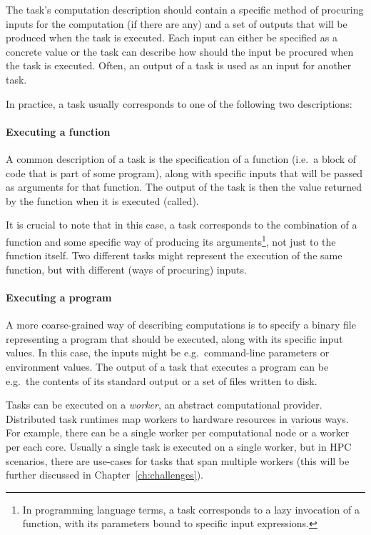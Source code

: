 The task's computation description should contain a specific method of procuring inputs for the
computation (if there are any) and a set of outputs that will be produced when the task is
executed. Each input can either be specified as a concrete value or the task can describe how
should the input be procured when the task is executed. Often, an output of a task is used as an
input for another task.

In practice, a task usually corresponds to one of the following two descriptions:

\paragraph{Executing a function} A common description of a task is the specification of a
function (i.e.\ a block of code that is part of some program), along with specific inputs that will
be passed as arguments for that function. The output of the task is then the value returned by the
function when it is executed (called).

It is crucial to note that in this case, a task corresponds to the combination of a function and
some specific way of producing its arguments\footnote{In programming language terms, a task corresponds to a lazy invocation of a function, with its parameters bound to specific input expressions.}, not just to the function
itself. Two different tasks might represent the execution of the same function, but with different
(ways of procuring) inputs.

\paragraph{Executing a program} A more coarse-grained way of describing computations is to specify
a binary file representing a program that should be executed, along with its specific input values.
In this case, the inputs might be e.g.\ command-line parameters or environment values. The output
of a task that executes a program can be e.g.\ the contents of its standard output or a set of
files written to disk.

\vspace{3mm}Tasks can be executed on a \emph{worker}, an abstract computational
provider. Distributed task runtimes map workers to hardware resources in various ways. For example,
there can be a single worker per computational node or a worker per each core. Usually a single
task is executed on a single worker, but in HPC scenarios, there are use-cases for tasks that span
multiple workers (this will be further discussed in Chapter~\ref{ch:challenges}).

